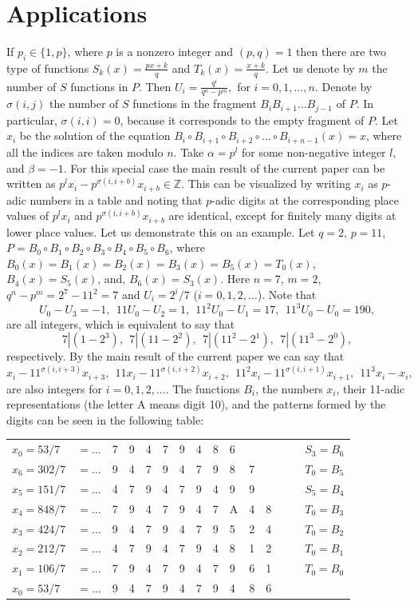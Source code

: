 \documentclass[12pt, twoside, leqno]{article}
\theoremstyle{definition}
\numberwithin{equation}{section}
\begin{document}
\section{Applications} If $p_i\in \{1,p\}$, where $p$ is a nonzero integer and $(p,q)=1$ then there are two type of functions $S_k(x)=\frac{px+k}{q}$ and $T_k(x)=\frac{x+k}{q}$. Let us denote by $m$ the number of $S$ functions in $P$. Then $U_i=\frac{q^{i}}{q^n-p^m},$ for $i=0,1,\ldots ,n$. Denote by $\sigma(i,j)$ the number of $S$ functions in the fragment $B_iB_{i+1}\ldots B_{j-1}$ of $P$. In particular, $\sigma(i,i)=0$, because it corresponds to the empty fragment of $P$. Let $x_i$ be the solution of the equation $B_i\circ B_{i+1} \circ B_{i+2} \circ \ldots \circ B_{i+n-1}(x)=x$, where all the indices are taken modulo $n$. Take $\alpha=p^l$ for some non-negative integer $l$, and $\beta= -1$. For this special case the main result of the current paper can be written as $p^l x_i- p^{\sigma(i,i+b)}x_{i+b}\in \mathbb{Z}$. This can be visualized by writing $x_i$ as $p$-adic numbers in a table and noting that $p$-adic digits at the corresponding place values of $p^lx_i$ and $p^{\sigma(i,i+b)}x_{i+b}$ are identical, except for finitely many digits at lower place values. Let us demonstrate this on an example. Let $q=2$, $p=11$, $P=B_0 \circ B_1 \circ B_2 \circ B_3 \circ B_4 \circ B_5 \circ B_6$, where $B_0 (x)=B_1 (x)=B_2 (x)=B_3 (x)=B_5 (x)=T_0(x)$, $B_4 (x)=S_5(x)$, and, $B_6 (x)=S_3(x)$. Here $n=7$, $m=2$, $q^n-p^m=2^7-11^2=7$ and $U_i=2^i/7$ ($i=0,1,2,\ldots$). Note that $$U_0-U_3=-1,\ \ 
11U_0-U_2=1,\ \ 11^2U_0-U_1=17,\ \ 11^3U_0-U_0=190,$$ are all integers, which is equivalent to say that $$7|(1-2^3),\ \ 7|(11-2^2),\ \ 7|(11^2-2^1),\ \ 7|(11^3-2^0),$$ respectively. By the main result of the current paper we can say that $$x_i-11^{\sigma(i,i+3)}x_{i+3},\ \ 11x_i-11^{\sigma(i,i+2)}x_{i+2},\ \ 11^2x_i-11^{\sigma(i,i+1)}x_{i+1},\ \ 11^3x_i-x_{i},$$ are also integers for $i=0,1,2,\ldots$. The functions $B_i$, the numbers $x_i$, their 11-adic representations (the letter A means digit 10), and the patterns formed by the digits can be seen in the following table:
\begin{center}
\begin{tabular}{ll|ll|ll|ll|ll|ll|lll}
$x_0=53/7$ & $=\ldots$   &7 & 9 & 4 & 7 & 9 & 4 & 8 & 6 &   &    & &   & $S_3=B_6$ \\
$x_6=302/7$ & $=\ldots$ &9 & 4 & 7 & 9 & 4 & 7 & 9 & 8 & 7 &    & &   & $T_0=B_5$ \\
$x_5=151/7$ & $=\ldots$ &4 & 7 & 9 & 4 & 7 & 9 & 4 & 9 & 9 &    & &   & $S_5=B_4$ \\
$x_4=848/7$ & $=\ldots$ &7 & 9 & 4 & 7 & 9 & 4 & 7 & A & 4 & 8 & &   &  $T_0=B_3$\\
$x_3=424/7$ & $=\ldots$ &9 & 4 & 7 & 9 & 4 & 7 & 9 & 5 & 2 & 4 & &   & $T_0=B_2$ \\
$x_2=212/7$ & $=\ldots$ &4 & 7 & 9 & 4 & 7 & 9 & 4 & 8 & 1 & 2 & &   & $T_0=B_1$ \\
$x_1=106/7$ & $=\ldots$ &7 & 9 & 4 & 7 & 9 & 4 & 7 & 9 & 6 & 1 & &   &  $T_0=B_0$\\
$x_0=53/7$ & $=\ldots$   &9 & 4 & 7 & 9 & 4 & 7 & 9 & 4 & 8 & 6 & &   &  \\
\end{tabular}
\end{center}
\end{document}
